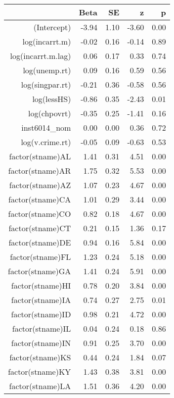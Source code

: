 \begin{table}[ht]
\centering
\begin{tabular}{rrrrr}
  \hline
 & Beta & SE & z & p \\ 
  \hline
(Intercept) & -3.94 & 1.10 & -3.60 & 0.00 \\ 
  log(incarrt.m) & -0.02 & 0.16 & -0.14 & 0.89 \\ 
  log(incarrt.m.lag) & 0.06 & 0.17 & 0.33 & 0.74 \\ 
  log(unemp.rt) & 0.09 & 0.16 & 0.59 & 0.56 \\ 
  log(singpar.rt) & -0.21 & 0.36 & -0.58 & 0.56 \\ 
  log(lessHS) & -0.86 & 0.35 & -2.43 & 0.01 \\ 
  log(chpovrt) & -0.35 & 0.25 & -1.41 & 0.16 \\ 
  inst6014\_nom & 0.00 & 0.00 & 0.36 & 0.72 \\ 
  log(v.crime.rt) & -0.05 & 0.09 & -0.63 & 0.53 \\ 
  factor(stname)AL & 1.41 & 0.31 & 4.51 & 0.00 \\ 
  factor(stname)AR & 1.75 & 0.32 & 5.53 & 0.00 \\ 
  factor(stname)AZ & 1.07 & 0.23 & 4.67 & 0.00 \\ 
  factor(stname)CA & 1.01 & 0.29 & 3.44 & 0.00 \\ 
  factor(stname)CO & 0.82 & 0.18 & 4.67 & 0.00 \\ 
  factor(stname)CT & 0.21 & 0.15 & 1.36 & 0.17 \\ 
  factor(stname)DE & 0.94 & 0.16 & 5.84 & 0.00 \\ 
  factor(stname)FL & 1.23 & 0.24 & 5.18 & 0.00 \\ 
  factor(stname)GA & 1.41 & 0.24 & 5.91 & 0.00 \\ 
  factor(stname)HI & 0.78 & 0.20 & 3.84 & 0.00 \\ 
  factor(stname)IA & 0.74 & 0.27 & 2.75 & 0.01 \\ 
  factor(stname)ID & 0.98 & 0.21 & 4.72 & 0.00 \\ 
  factor(stname)IL & 0.04 & 0.24 & 0.18 & 0.86 \\ 
  factor(stname)IN & 0.91 & 0.25 & 3.70 & 0.00 \\ 
  factor(stname)KS & 0.44 & 0.24 & 1.84 & 0.07 \\ 
  factor(stname)KY & 1.43 & 0.38 & 3.81 & 0.00 \\ 
  factor(stname)LA & 1.51 & 0.36 & 4.20 & 0.00 \\ 

\end{tabular}
\end{table}
